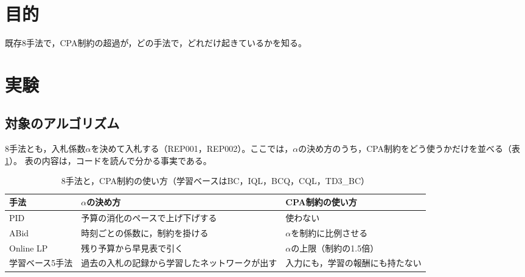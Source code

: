 \documentclass[twocolumn, 10pt]{ujarticle}
\begin{document}
\beginverification

\section{目的}\label{sec:e-purpose}

既存8手法で，CPA制約の超過が，どの手法で，どれだけ起きているかを知る。

\section{実験}\label{sec:e-exp}

\subsection{対象のアルゴリズム}\label{sec:e-algo}

8手法とも，入札係数$\alpha$を決めて入札する（REP001，REP002）。ここでは，$\alpha$の決め方のうち，CPA制約をどう使うかだけを並べる（表\ref{tab:algo}）。
表の内容は，コードを読んで分かる事実である。

\begin{table}[H]
\centering
\caption{8手法と，CPA制約の使い方（学習ベースはBC，IQL，BCQ，CQL，TD3\_BC）}
\label{tab:algo}
\footnotesize
\begin{tabularx}{\linewidth}{@{}p{1.7cm}>{\raggedright\arraybackslash}X>{\raggedright\arraybackslash}X@{}}
\toprule
手法 & $\alpha$の決め方 & CPA制約の使い方 \\
\midrule
PID & 予算の消化のペースで上げ下げする & 使わない \\
ABid & 時刻ごとの係数に，制約を掛ける & $\alpha$を制約に比例させる \\
Online LP & 残り予算から早見表で引く & $\alpha$の上限（制約の1.5倍） \\
学習ベース5手法 & 過去の入札の記録から学習したネットワークが出す & 入力にも，学習の報酬にも持たない \\
\bottomrule
\end{tabularx}
\end{table}
\end{document}
